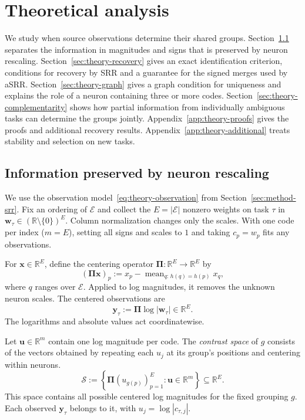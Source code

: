 \section{Theoretical analysis}
\label{sec:theory}

We study when source observations determine their shared groups.
Section~\ref{sec:theory-observations} separates the information in
magnitudes and signs that is preserved by neuron rescaling.
Section~\ref{sec:theory-recovery} gives an exact identification
criterion, conditions for recovery by SRR and a guarantee for the
signed merges used by aSRR.
Section~\ref{sec:theory-graph} gives a graph condition for uniqueness
and explains the role of a neuron containing three or more codes.
Section~\ref{sec:theory-complementarity} shows how partial information
from individually ambiguous tasks can determine the groups jointly.
Appendix~\ref{app:theory-proofs} gives the proofs and additional
recovery results. Appendix~\ref{app:theory-additional} treats
stability and selection on new tasks.

\subsection{Information preserved by neuron rescaling}
\label{sec:theory-observations}

We use the observation model~\eqref{eq:theory-observation} from
Section~\ref{sec:method-srr}. Fix an ordering of $\mathcal E$ and
collect the $E=|\mathcal E|$ nonzero weights on task $\tau$ in
$\mathbf w_\tau\in(\mathbb R\setminus\{0\})^E$. Column normalization
changes only the scales. With one code per index ($m=E$),
setting all signs and scales to $1$ and taking $c_p=w_p$ fits any
observations.

For $\mathbf x\in\mathbb R^E$, define the centering operator
$\boldsymbol\Pi:\mathbb R^E\to\mathbb R^E$ by
\begin{equation*}
    (\boldsymbol\Pi\mathbf x)_p
        :=x_p-\operatorname{mean}_{q:\,h(q)=h(p)}x_q ,
\end{equation*}
where $q$ ranges over $\mathcal E$.
Applied to log magnitudes, it removes the unknown neuron scales.
The centered observations are
\begin{equation}
    \mathbf y_\tau:=\boldsymbol\Pi\log|\mathbf w_\tau|
        \in\mathbb R^E.
    \label{eq:theory-contrasts}
\end{equation}
The logarithms and absolute values act coordinatewise.

Let $\mathbf u\in\mathbb R^m$ contain one log magnitude per code.
The \emph{contrast space} of $g$ consists of the vectors obtained
by repeating each $u_j$ at its group's positions and centering within neurons.
\begin{equation}
    \mathcal S
    :=\left\{\boldsymbol\Pi (u_{g(p)})_{p=1}^E :
        \mathbf u\in\mathbb R^m\right\}
       \subseteq\mathbb R^E.
    \label{eq:theory-contrast-space}
\end{equation}
This space contains all possible centered log magnitudes for the
fixed grouping $g$. Each observed $\mathbf y_\tau$ belongs
to it, with
$u_j=\log|c_{\tau,j}|$.

